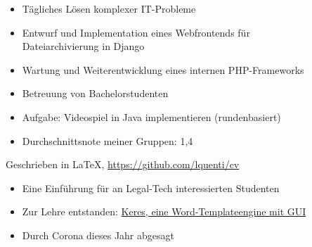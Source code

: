\documentclass[10pt,a4paper,ragged2e,withhyper]{altacv}
\begin{document}
\begin{paracol}{2}

\medskip
\begin{itemize}
\item T\"agliches L\"osen komplexer IT-Probleme
\item Entwurf und Implementation eines Webfrontends f\"ur\\Dateiarchivierung in Django
\end{itemize}

\divider

\medskip
\begin{itemize}
\item Wartung und Weiterentwicklung eines internen PHP-Frameworks
\end{itemize}

\divider

\medskip
\begin{itemize}
\item Betreuung von Bachelorstudenten
\item Aufgabe: Videospiel in Java implementieren (rundenbasiert)
\item Durchschnittsnote meiner Gruppen: 1,4
\end{itemize}


Geschrieben in \LaTeX, \href{https://github.com/lquenti/cv}{https://github.com/lquenti/cv}

\divider

\begin{itemize}
\item Eine Einf\"uhrung f\"ur an Legal-Tech interessierten Studenten
\item Zur Lehre entstanden: \href{https://github.com/elegal-ev/Keres}{Keres, eine Word-Templateengine mit GUI}
\item Durch Corona dieses Jahr abgesagt
\end{itemize}


\end{paracol}
\end{document}
